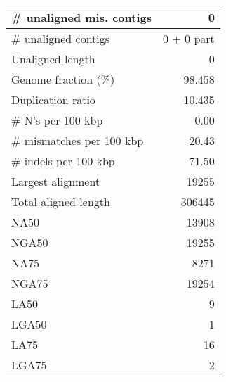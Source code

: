 \documentclass[12pt,a4paper]{article}
\begin{document}
\begin{table}[ht]
\begin{center}
\begin{tabular}{|l*{1}{|r}|}
\# unaligned mis. contigs & 0 \\ \hline
\# unaligned contigs & 0 + 0 part \\ \hline
Unaligned length & 0 \\ \hline
Genome fraction (\%) & 98.458 \\ \hline
Duplication ratio & 10.435 \\ \hline
\# N's per 100 kbp & 0.00 \\ \hline
\# mismatches per 100 kbp & 20.43 \\ \hline
\# indels per 100 kbp & 71.50 \\ \hline
Largest alignment & 19255 \\ \hline
Total aligned length & 306445 \\ \hline
NA50 & 13908 \\ \hline
NGA50 & 19255 \\ \hline
NA75 & 8271 \\ \hline
NGA75 & 19254 \\ \hline
LA50 & 9 \\ \hline
LGA50 & 1 \\ \hline
LA75 & 16 \\ \hline
LGA75 & 2 \\ \hline
\end{tabular}
\end{center}
\end{table}
\end{document}
